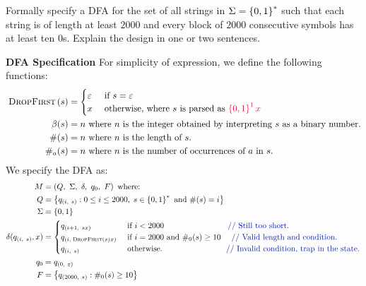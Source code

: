 \begin{problem}
  Formally specify a DFA for the set of all strings in $\Sigma = \left\{0, 1\right\}^*$
  such that each string is of length at least $2000$ and every block of $2000$
  consecutive symbols has at least ten $0$s.
  Explain the design in one or two sentences.
\end{problem}

\begin{Answer}
  \step
  \textbf{DFA Specification}
  \step
  For simplicity of expression, we define the following functions:
  \begin{align*}
    \shift{s} &= \begin{cases}
      \eps &\text{ if } s = \eps\\
      x &\text{ otherwise, where } s \text{ is parsed as } \crim{\set{0, 1}^1x} \\
    \end{cases} \\
    \beta(s) &= n \text{ where $n$ is the integer obtained by interpreting $s$ as a binary number.} \\
    \#(s) &= n \text{ where $n$ is the length of $s$.} \\
    \#_a(s) &= n \text{ where $n$ is the number of occurrences of $a$ in $s$.}
  \end{align*}
  \step
  We specify the DFA as:
  \begin{align*}
    M &= \left( Q,\ \Sigma,\ \delta,\ q_0,\ F \right) \text{ where: }\\
    Q &= \set{ q_{(i,\ s)} : 0 \leq i \le 2000,\; s \in \set{0, 1}^* \text{ and } \#(s) = i} \\
    \Sigma &= \set{0, 1} \\
    \delta(q_{(i,\ s)}, x) &= \begin{cases}
      q_{(i+1,\ sx)} &\text{ if } i < 2000 \quad \quad \quad \quad \quad \quad \quad \quad \zaff{\text{// Still too short.}}\\
      q_{(i, \shift{s}x)} &\text{ if $i = 2000$ and } \#_0(s) \ge 10 \quad \zaff{\text{ // Valid length and condition.}} \\
      q_{(i,\ s)} &\text{ otherwise.} \quad \quad \quad \quad \quad \quad \quad \quad \zaff{\text{// Invalid condition, trap in the state.}}
    \end{cases} \\
    q_0 &= q_{(0,\ \eps)} \\
    F &= \set{ q_{(2000,\ s)} : \#_0(s) \ge 10}
  \end{align*}
\end{Answer}
